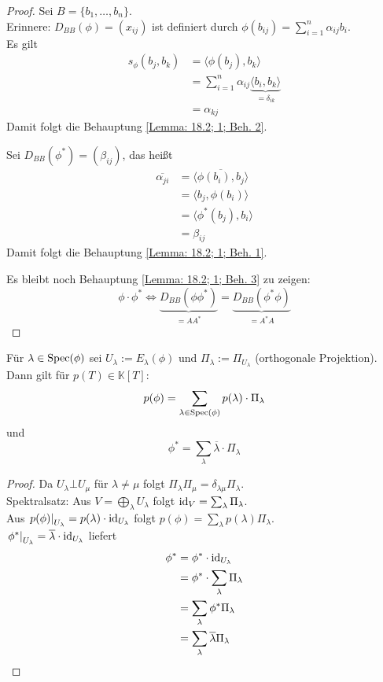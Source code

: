 \documentclass[parskip,a4paper,twoside,DIV15,BCOR12mm]{scrbook}
\begin{document}
\begin{proof}
Sei \(B=\{b_{1},\ldots,b_{n}\}\).\\
Erinnere: \(D_{BB}(\phi)=(x_{ij})\) ist 
definiert durch \(\phi(b_{ij})=\sum_{i=1}^{n}{\alpha_{ij}b_{i}}\).\\
Es gilt
\begin{align*}
s_{\phi}(b_{j},b_{k})&=\langle\phi(b_{j}),b_{k}\rangle\\
&=\sum_{i=1}^{n}{\alpha_{ij}\underbrace{\langle b_{i},b_{k}\rangle}_{=\delta_{ik}}}\\
&=\alpha_{kj}
\end{align*}
Damit folgt die Behauptung \eqref{Lemma: 18.2; 1; Beh. 2}.

Sei \(D_{BB}(\phi^{*})=(\beta_{ij})\), das heißt
\begin{align*}
\overline{\alpha_{ji}}&=\overline{\langle\phi(b_{i}),b_{j}\rangle}\\
&=\langle b_{j},\phi(b_{i})\rangle\\
&=\langle\phi^{*}(b_{j}),b_{i}\rangle\\
&=\beta_{ij}
\end{align*}
Damit folgt die Behauptung \eqref{Lemma: 18.2; 1; Beh. 1}.

Es bleibt noch Behauptung \eqref{Lemma: 18.2; 1; Beh. 3} zu zeigen:
\[
\phi\cdot\phi^{*}\Longleftrightarrow
\underbrace{D_{BB}(\phi\phi^{*})}_{=AA^{*}}=
\underbrace{D_{BB}(\phi^{*}\phi)}_{=A^{*}A}
\]
\end{proof}
\begin{corollary}
Für \(\lambda\in\operatorname{Spec}(\phi)\) sei \(U_{\lambda}:=E_{\lambda}(\phi)\) und
\(\Pi_{\lambda}:=\Pi_{U_{\lambda}}\) (orthogonale Projektion). Dann gilt für
\(p(T)\in\mathbb{K}[T]\):
\[
p(\phi)=\sum_{\lambda\in\operatorname{Spec}(\phi)}{p(\lambda)\cdot\Pi_{\lambda}}
\]
und
\[
\phi^{*}=\sum_{\lambda}{\overline{\lambda}\cdot\Pi_{\lambda}}
\]
\end{corollary}
\begin{proof}
Da \(U_{\lambda}\bot U_{\mu}\) für \(\lambda\neq\mu\) folgt \(\Pi_{\lambda}\Pi_{\mu}=\delta_{\lambda\mu}\Pi_{\lambda}\).\\
Spektralsatz: Aus \(V=\underset{\lambda}{\bigoplus}U_{\lambda}\) folgt 
\(\operatorname{id}_{V}=\sum_{\lambda}{\Pi_{\lambda}}\).\\
Aus \(\left.p(\phi)\right|_{U_{\lambda}}=p(\lambda)\cdot\operatorname{id}_{U_{\lambda}}\)
folgt \(p(\phi)=\sum_{\lambda}{p(\lambda)\Pi_{\lambda}}\).\\
\(\left.\phi^{*}\right|_{U_{\lambda}}=\overline{\lambda}\cdot\operatorname{id}_{U_{\lambda}}\)
liefert
\begin{align*}
\phi^{*}&=\phi^{*}\cdot\operatorname{id}_{U_{\lambda}}\\
&=\phi^{*}\cdot\sum_{\lambda}{\Pi_{\lambda}}\\
&=\sum_{\lambda}{\phi^{*}\Pi_{\lambda}}\\
&=\sum_{\lambda}{\overline{\lambda}\Pi_{\lambda}}
\end{align*}
\end{proof}
\end{document}
